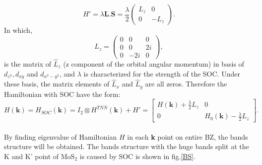 \documentclass[12pt,english,a4paper]{article}
\begin{document}
	\begin{equation}
		H' = \lambda \textbf{L}.\textbf{S}=\frac{\lambda}{2}\begin{pmatrix}
			L_z &0\\
			0 & -L_z
		\end{pmatrix}.
	\end{equation}
	In which,
	\begin{equation}
		L_z = \begin{pmatrix}
			0 & 0 & 0\\
			0 & 0 & 2i\\
			0 & -2i& 0
		\end{pmatrix},
	\end{equation}
	is the matrix of $\hat{L}_z$ (z component of the orbital angular momentum) in basis of $d_{z^2}, d_{xy}$ and $d_{x^2-y^2}$, and $\lambda$ is characterized for the strength of the SOC. Under these basis, the matrix elements of $\hat{L}_x$ and $\hat{L}_y$ are all zeros. Therefore the Hamiltonian with SOC have the form:
	\begin{equation}
		H(\textbf{k}) = H_{SOC} (\textbf{k}) = I_2 \otimes H^{TNN} (\textbf{k}) +H' = \begin{bmatrix}
			H (\textbf{k}) + \frac{\lambda}{2} L_z & 0\\
			0& H_0 (\textbf{k}) - \frac{\lambda}{2} L_z
		\end{bmatrix}.
	\end{equation}
	\\By finding eigenvalue of Hamiltonian $H$ in each \textbf{k} point on entire BZ, the bands structure will be obtained. The bands structure with the huge bands split at the K and K' point of $\mathrm{MoS}_2$ is caused by SOC is shown in fig.\ref{BS}.
\end{document}
